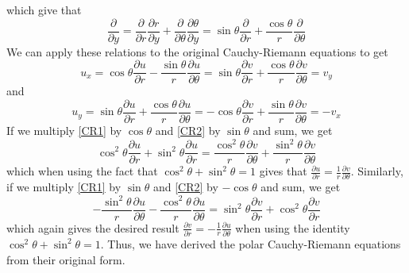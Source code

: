 \documentclass{article}
\begin{document}
which give that
\begin{equation*}
    \frac{\partial}{\partial y} = \frac{\partial}{\partial r}\frac{\partial r}{\partial y}+\frac{\partial}{\partial \theta}\frac{\partial \theta}{\partial y} = \sin\theta\frac{\partial}{\partial r}+\frac{\cos\theta}{r}\frac{\partial}{\partial \theta}
\end{equation*}
We can apply these relations to the original Cauchy-Riemann equations to get 
\begin{equation}\label{CR1}
    u_x=\cos\theta\frac{\partial u}{\partial r}-\frac{\sin\theta}{r}\frac{\partial u}{\partial \theta}=\sin\theta\frac{\partial v}{\partial r}+\frac{\cos\theta}{r}\frac{\partial v}{\partial \theta}=v_y
\end{equation}
and 
\begin{equation}\label{CR2}
    u_y=\sin\theta\frac{\partial u}{\partial r}+\frac{\cos\theta}{r}\frac{\partial u}{\partial \theta}=-\cos\theta\frac{\partial v}{\partial r}+\frac{\sin\theta}{r}\frac{\partial v}{\partial \theta}=-v_x
\end{equation}
If we multiply \eqref{CR1} by $\cos\theta$ and \eqref{CR2} by $\sin\theta$ and sum, we get 
\begin{equation*}
    \cos^2\theta\frac{\partial u}{\partial r}+\sin^2\theta\frac{\partial u}{\partial r}=\frac{\cos^2\theta}{r}\frac{\partial v}{\partial \theta}+\frac{\sin^2\theta}{r}\frac{\partial v}{\partial \theta}
\end{equation*}
which when using the fact that $\cos^2\theta+\sin^2\theta=1$ gives that $\frac{\partial u}{\partial r}=\frac{1}{r}\frac{\partial v}{\partial \theta}$.
Similarly, if we multiply \eqref{CR1} by $\sin\theta$ and \eqref{CR2} by $-\cos\theta$ and sum, we get
\begin{equation*}
    -\frac{\sin^2\theta}{r}\frac{\partial u}{\partial \theta}-\frac{\cos^2\theta}{r}\frac{\partial u}{\partial \theta}=\sin^2\theta\frac{\partial v}{\partial r}+\cos^2\theta\frac{\partial v}{\partial r}
\end{equation*}
which again gives the desired result $\frac{\partial v}{\partial r}=-\frac{1}{r}\frac{\partial u}{\partial \theta}$ when using the identity $\cos^2\theta+\sin^2\theta=1$.
Thus, we have derived the polar Cauchy-Riemann equations from their original form.
\end{document}
